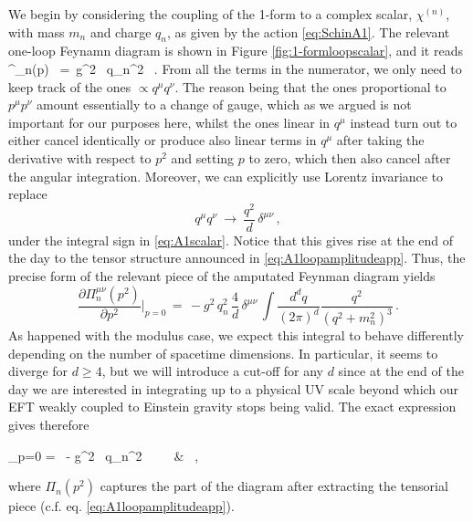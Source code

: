 We begin by considering the coupling of the 1-form to a complex scalar, $\chi^{(n)}$, with mass $m_n$ and charge $q_n$, as given by the action \eqref{eq:SchinA1}. The relevant one-loop Feynamn diagram is shown in Figure \ref{fig:1-formloopscalar}, and it reads
%
\beq
		\Pi^{\mu \nu}_n(p) \, =\,   g^2 \, q_n^2 \int {}  \, .
\label{eq:A1scalar}
\eeq
%
From all the terms in the numerator, we only need to keep track of the ones $\propto q^\mu q^\nu$. The reason being that the ones proportional to $p^\mu p^\nu$ amount essentially to a change of gauge, which as we argued is not important for our purposes here, whilst the ones linear in $q^\mu$ instead turn out to either cancel identically or produce also linear terms in $q^\mu$ after taking the derivative with respect to $p^2$ and setting $p$ to zero, which then also cancel after the angular integration. Moreover, we can explicitly use Lorentz invariance to replace
%
\begin{equation}
\label{eq:qmuqnuaverage}
			q^\mu q^\nu \ \longrightarrow \ \dfrac{q^2}{d} \, \delta^{\mu \nu}\, ,
\end{equation}
%
under the integral sign in \eqref{eq:A1scalar}. Notice that this gives rise at the end of the day to the tensor structure announced in \eqref{eq:A1loopamplitudeapp}. Thus, the precise form of the relevant piece of the amputated Feynman diagram yields
%
\begin{equation}\label{eq:1-formscalarloopprop}
			\frac{\partial \Pi^{\mu \nu}_n(p^2)}{\partial p^2} \bigg\rvert_{p=0} \, = \, -g^2\,  q_n^2\,   \frac{4}{d} \, \delta^{\mu\nu} \, \int \dfrac{d^d q}{(2\pi)^d} \dfrac{q^2}{(q^2+m_n^2)^3} \, .
\end{equation}
%
As happened with the modulus case, we expect this integral to behave differently depending on the number of spacetime dimensions. In particular, it seems to diverge for $d\geq4$, but we will introduce a cut-off for any $d$ since at the end of the day we are interested in integrating up to a physical UV scale beyond which our EFT weakly coupled to Einstein gravity stops being valid. The exact expression gives therefore
%
\beq
		\begin{split}
			 \bigg\rvert_{p=0}   =  \, - g^2 \, q_n^2  \  \  \ &   \, ,
		\end{split}
\label{eq:1-formloopscalarexact}
\eeq
%  
where $\Pi_n(p^2)$ captures the part of the diagram after extracting the tensorial piece (c.f. eq. \eqref{eq:A1loopamplitudeapp}).
		

